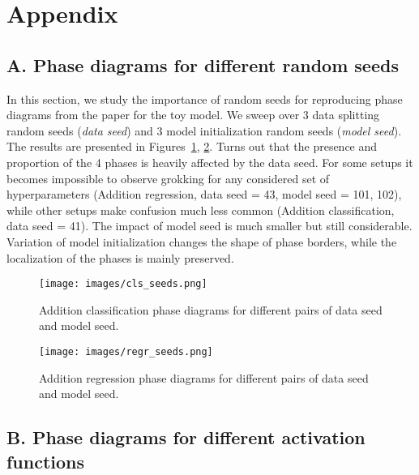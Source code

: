 \section*{Appendix}
\label{sec:app}

\subsection*{A. Phase diagrams for different random seeds}
\label{app:A}

In this section, we study the importance of random seeds for reproducing phase diagrams from the paper for the toy model. We sweep over 3 data splitting random seeds (\emph{data seed}) and 3 model initialization random seeds (\emph{model seed}). The results are presented in Figures~\ref{fig:cls-seeds}, \ref{fig:regr-seeds}. Turns out that the presence and proportion of the 4 phases is heavily affected by the data seed. For some setups it becomes impossible to observe grokking for any considered set of hyperparameters (Addition regression, data seed = 43, model seed = 101, 102), while other setups make confusion much less common (Addition classification, data seed = 41). The impact of model seed is much smaller but still considerable. Variation of model initialization changes the shape of phase borders, while the localization of the phases is mainly preserved.

\begin{figure}[H]
\caption{Addition classification phase diagrams for different pairs of data seed and model seed.}
\centering
\texttt{[image: images/cls\_seeds.png]}
\label{fig:cls-seeds}
\end{figure}

\begin{figure}[H]
\caption{Addition regression phase diagrams for different pairs of data seed and model seed.}
\centering
\texttt{[image: images/regr\_seeds.png]}
\label{fig:regr-seeds}
\end{figure}

\subsection*{B. Phase diagrams for different activation functions}
\label{app:B}

